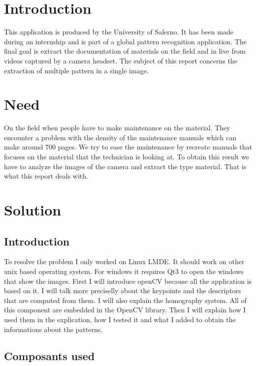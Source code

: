 \documentclass[english,a4paper,11pt]{report}
\begin{document}
\chapter{Introduction}
	This application is produced by the University of Salerno. It has been made during an internship and is part of a global pattern recognition application. The final goal is extract the documentation of materials on the field and in live from videos captured by a camera headset. The subject of this report concerns the extraction of multiple pattern in a single image.

\chapter{Need}
	On the field when people have to make maintenance on the material. They encounter a problem with the density of the maintenance manuals which can make around 700 pages. We try to ease the maintenance by recreate manuals that focuses on the material that the technician is looking at. To obtain this result we have to analyze the images of the camera and extract the type material. That is what this report deals with.


\chapter{Solution}
\section{Introduction}
\par To resolve the problem I only worked on Linux LMDE. It should work on other unix based operating system. For windows it requires Qt3 to open the windows that show the images.
First I will introduce openCV because all the application is based on it. I will talk more preciselly about the keypoints and the descriptors that are computed from them. I will also explain the homography system. All of this component are embedded in the OpenCV library.
Then I will explain how I used them in the explication, how I tested it and what I added to obtain the informations about the patterns.

\section{Composants used}
\end{document}
